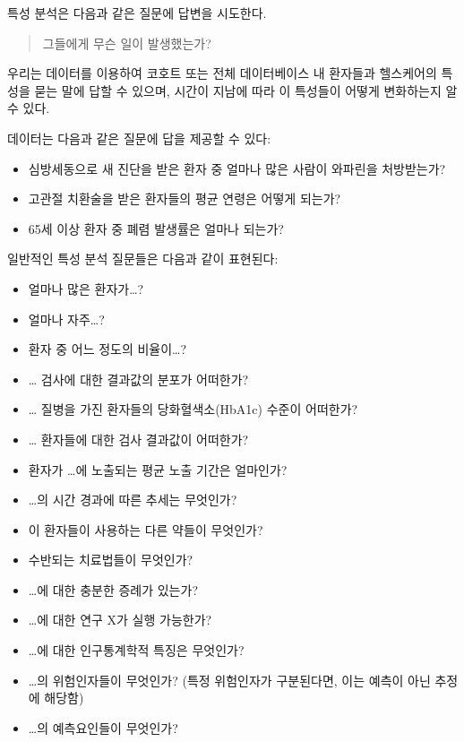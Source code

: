 \documentclass[11pt]{book}
\providecommand{\tightlist}{%
  \setlength{\itemsep}{0pt}\setlength{\parskip}{0pt}}
\theoremstyle{definition}
\theoremstyle{definition}
\theoremstyle{definition}
\theoremstyle{remark}
\begin{document}

특성 분석은 다음과 같은 질문에 답변을 시도한다.

\begin{quote}
그들에게 무슨 일이 발생했는가?
\end{quote}

우리는 데이터를 이용하여 코호트 또는 전체 데이터베이스 내 환자들과
헬스케어의 특성을 묻는 말에 답할 수 있으며, 시간이 지남에 따라 이
특성들이 어떻게 변화하는지 알 수 있다.

데이터는 다음과 같은 질문에 답을 제공할 수 있다:

\begin{itemize}
\tightlist
\item
  심방세동으로 새 진단을 받은 환자 중 얼마나 많은 사람이 와파린을
  처방받는가?
\item
  고관절 치환술을 받은 환자들의 평균 연령은 어떻게 되는가?
\item
  65세 이상 환자 중 폐렴 발생률은 얼마나 되는가?
\end{itemize}

일반적인 특성 분석 질문들은 다음과 같이 표현된다:

\begin{itemize}
\tightlist
\item
  얼마나 많은 환자가\ldots{}?
\item
  얼마나 자주\ldots{}?
\item
  환자 중 어느 정도의 비율이\ldots{}?
\item
  \ldots{} 검사에 대한 결과값의 분포가 어떠한가?
\item
  \ldots{} 질병을 가진 환자들의 당화혈색소(HbA1c) 수준이 어떠한가?
\item
  \ldots{} 환자들에 대한 검사 결과값이 어떠한가?
\item
  환자가 \ldots{}에 노출되는 평균 노출 기간은 얼마인가?
\item
  \ldots{}의 시간 경과에 따른 추세는 무엇인가?
\item
  이 환자들이 사용하는 다른 약들이 무엇인가?
\item
  수반되는 치료법들이 무엇인가?
\item
  \ldots{}에 대한 충분한 증례가 있는가?
\item
  \ldots{}에 대한 연구 X가 실행 가능한가?
\item
  \ldots{}에 대한 인구통계학적 특징은 무엇인가?
\item
  \ldots{}의 위험인자들이 무엇인가? (특정 위험인자가 구분된다면, 이는
  예측이 아닌 추정에 해당함)
\item
  \ldots{}의 예측요인들이 무엇인가?
\end{itemize}
\end{document}
